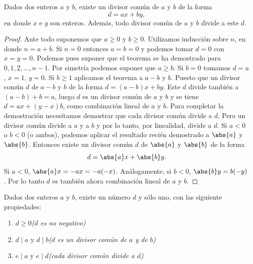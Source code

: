 \documentclass[12pt,a4paper]{book}
\begin{document}
    \begin{teorema}
        Dados dos enteros $a$ y $b$, existe un divisor común de $a$ y $b$ de la forma
        \begin{equation*}
            d=ax+by,
        \end{equation*}
        en donde $x$ e $y$ son enteros. Además, todo divisor común de $a$ y $b$ divide a este
        $d$. 
    \end{teorema}

    \begin{proof}
        Ante todo suponemos que $a\geq0$ y $b\geq0$. Utilizamos inducción sobre $n$, en donde
        $n=a+b$. Si $n=0$ entonces $a=b=0$ y podemos tomar $d=0$ con $x=y=0$. Podemos pues suponer
        que el teorema se ha demostrado para $0,1,2,\dots,n-1$. Por simetría podemos suponer que
        $a\geq b$. Si $b=0$ tomamos $d=a$, $x=1$, $y=0$. Si $b\geq1$ aplicamos el teorema a
        $a-b$ y $b$. Puesto que un divisor común $d$ de $a-b$ y $b$ de la forma $d=(a-b)x+by$.
        Este $d$ divide también a $(a-b)+b=a$, luego $d$ es un divisor común de $a$ y $b$ y se
        tiene $d=ax+(y-x)b$, como combinación lineal de $a$ y $b$. Para completar la demostración
        necesitamos demostrar que cada divisor común divide a $d$. Pero un divisor común divide
        a $a$ y a $b$ y por lo tanto, por linealidad, divide a $d$. Si $a\lt0$ o $b\lt0$ (o ambos),
        podemos aplicar el resultado recién demostrado a $\abs{a}$ y $\abs{b}$. Entonces existe
        un divisor común  $d$ de $\abs{a}$ y $\abs{b}$ de la forma
        \begin{equation*}
            d=\abs{a}x+\abs{b}y.
        \end{equation*}
        Si $a\lt0$, $\abs{a}x=-ax=-a(-x)$. Análogamente, si $b\lt0$, $\abs{b}y=b(-y)$. Por
        lo tanto $d$ es también ahora combinación lineal de $a$ y $b$.
    \end{proof}

    \begin{teorema}
        Dados dos enteros $a$ y $b$, existe un número $d$ y sólo uno, con las siguiente
        propiedades:
        \begin{enumerate}
            \item[(a)] $d\geq0$\hfill\textit{($d$ es no negativo)}
            \item[(b)] $d\mid a$ y $d\mid b$\hfill\textit{($d$ es un divisor común de $a$ y de $b$)}
            \item[(c)] $e\mid a$ y $e\mid d$\hfill\textit{(cada divisor común divide a $d$)}  
        \end{enumerate}
    \end{teorema}
\end{document}
